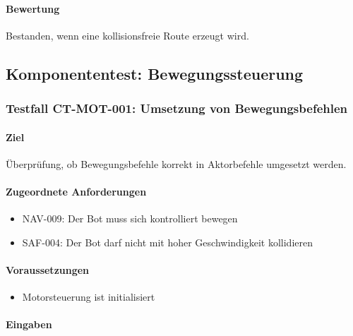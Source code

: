 \paragraph{Bewertung}\label{bewertung-3}

Bestanden, wenn eine kollisionsfreie Route erzeugt wird.

\subsection{Komponententest:
Bewegungssteuerung}\label{komponententest-bewegungssteuerung}

\subsubsection{Testfall CT-MOT-001: Umsetzung von
Bewegungsbefehlen}\label{testfall-ct-mot-001-umsetzung-von-bewegungsbefehlen}

\paragraph{Ziel}\label{ziel-4}

Überprüfung, ob Bewegungsbefehle korrekt in Aktorbefehle umgesetzt
werden.

\paragraph{Zugeordnete Anforderungen}\label{zugeordnete-anforderungen-4}

\begin{itemize}
\tightlist
\item
  NAV-009: Der Bot muss sich kontrolliert bewegen
\item
  SAF-004: Der Bot darf nicht mit hoher Geschwindigkeit kollidieren
\end{itemize}

\paragraph{Voraussetzungen}\label{voraussetzungen-4}

\begin{itemize}
\tightlist
\item
  Motorsteuerung ist initialisiert
\end{itemize}

\paragraph{Eingaben}\label{eingaben-4}

